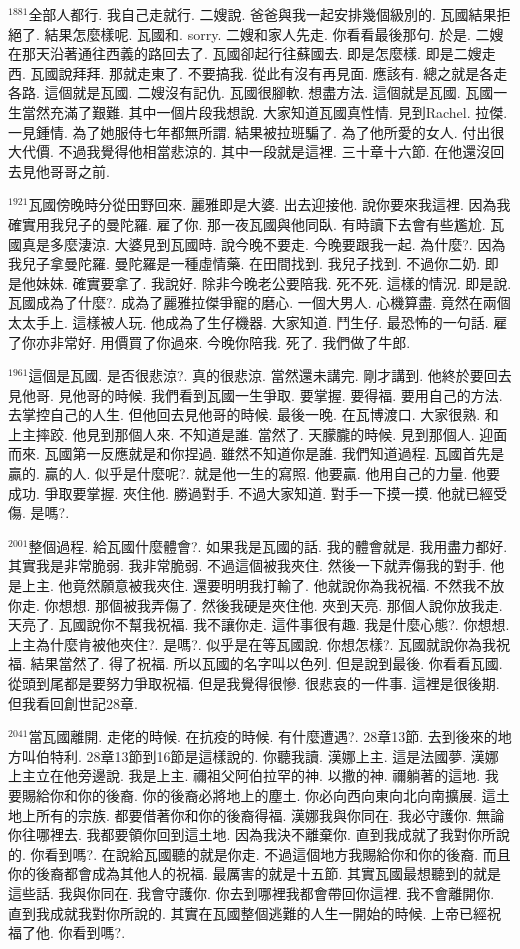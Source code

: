 \documentclass{book}
\begin{document}
$^{1881}$全部人都行.
我自己走就行.
二嫂說.
爸爸與我一起安排幾個級別的.
瓦國結果拒絕了.
結果怎麼樣呢.
瓦國和.
sorry.
二嫂和家人先走.
你看看最後那句.
於是.
二嫂在那天沿著通往西義的路回去了.
瓦國卻起行往蘇國去.
即是怎麼樣.
即是二嫂走西.
瓦國說拜拜.
那就走東了.
不要搞我.
從此有沒有再見面.
應該有.
總之就是各走各路.
這個就是瓦國.
二嫂沒有記仇.
瓦國很腳軟.
想盡方法.
這個就是瓦國.
瓦國一生當然充滿了艱難.
其中一個片段我想說.
大家知道瓦國真性情.
見到Rachel.
拉傑.
一見鍾情.
為了她服侍七年都無所謂.
結果被拉班騙了.
為了他所愛的女人.
付出很大代價.
不過我覺得他相當悲涼的.
其中一段就是這裡.
三十章十六節.
在他還沒回去見他哥哥之前.

$^{1921}$瓦國傍晚時分從田野回來.
麗雅即是大婆.
出去迎接他.
說你要來我這裡.
因為我確實用我兒子的曼陀羅.
雇了你.
那一夜瓦國與他同臥.
有時讀下去會有些尷尬.
瓦國真是多麼淒涼.
大婆見到瓦國時.
說今晚不要走.
今晚要跟我一起.
為什麼?.
因為我兒子拿曼陀羅.
曼陀羅是一種虛情藥.
在田間找到.
我兒子找到.
不過你二奶.
即是他妹妹.
確實要拿了.
我說好.
除非今晚老公要陪我.
死不死.
這樣的情況.
即是說.
瓦國成為了什麼?.
成為了麗雅拉傑爭寵的磨心.
一個大男人.
心機算盡.
竟然在兩個太太手上.
這樣被人玩.
他成為了生仔機器.
大家知道.
鬥生仔.
最恐怖的一句話.
雇了你亦非常好.
用價買了你過來.
今晚你陪我.
死了.
我們做了牛郎.

$^{1961}$這個是瓦國.
是否很悲涼?.
真的很悲涼.
當然還未講完.
剛才講到.
他終於要回去見他哥.
見他哥的時候.
我們看到瓦國一生爭取.
要掌握.
要得福.
要用自己的方法.
去掌控自己的人生.
但他回去見他哥的時候.
最後一晚.
在瓦博渡口.
大家很熟.
和上主摔跤.
他見到那個人來.
不知道是誰.
當然了.
天朦朧的時候.
見到那個人.
迎面而來.
瓦國第一反應就是和你捏過.
雖然不知道你是誰.
我們知道過程.
瓦國首先是贏的.
贏的人.
似乎是什麼呢?.
就是他一生的寫照.
他要贏.
他用自己的力量.
他要成功.
爭取要掌握.
夾住他.
勝過對手.
不過大家知道.
對手一下摸一摸.
他就已經受傷.
是嗎?.

$^{2001}$整個過程.
給瓦國什麼體會?.
如果我是瓦國的話.
我的體會就是.
我用盡力都好.
其實我是非常脆弱.
我非常脆弱.
不過這個被我夾住.
然後一下就弄傷我的對手.
他是上主.
他竟然願意被我夾住.
還要明明我打輸了.
他就說你為我祝福.
不然我不放你走.
你想想.
那個被我弄傷了.
然後我硬是夾住他.
夾到天亮.
那個人說你放我走.
天亮了.
瓦國說你不幫我祝福.
我不讓你走.
這件事很有趣.
我是什麼心態?.
你想想.
上主為什麼肯被他夾住?.
是嗎?.
似乎是在等瓦國說.
你想怎樣?.
瓦國就說你為我祝福.
結果當然了.
得了祝福.
所以瓦國的名字叫以色列.
但是說到最後.
你看看瓦國.
從頭到尾都是要努力爭取祝福.
但是我覺得很慘.
很悲哀的一件事.
這裡是很後期.
但我看回創世記28章.

$^{2041}$當瓦國離開.
走佬的時候.
在抗疫的時候.
有什麼遭遇?.
28章13節.
去到後來的地方叫伯特利.
28章13節到16節是這樣說的.
你聽我讀.
漢娜上主.
這是法國夢.
漢娜上主立在他旁邊說.
我是上主.
禰祖父阿伯拉罕的神.
以撒的神.
禰躺著的這地.
我要賜給你和你的後裔.
你的後裔必將地上的塵土.
你必向西向東向北向南擴展.
這土地上所有的宗族.
都要借著你和你的後裔得福.
漢娜我與你同在.
我必守護你.
無論你往哪裡去.
我都要領你回到這土地.
因為我決不離棄你.
直到我成就了我對你所說的.
你看到嗎?.
在說給瓦國聽的就是你走.
不過這個地方我賜給你和你的後裔.
而且你的後裔都會成為其他人的祝福.
最厲害的就是十五節.
其實瓦國最想聽到的就是這些話.
我與你同在.
我會守護你.
你去到哪裡我都會帶回你這裡.
我不會離開你.
直到我成就我對你所說的.
其實在瓦國整個逃難的人生一開始的時候.
上帝已經祝福了他.
你看到嗎?.
\end{document}

